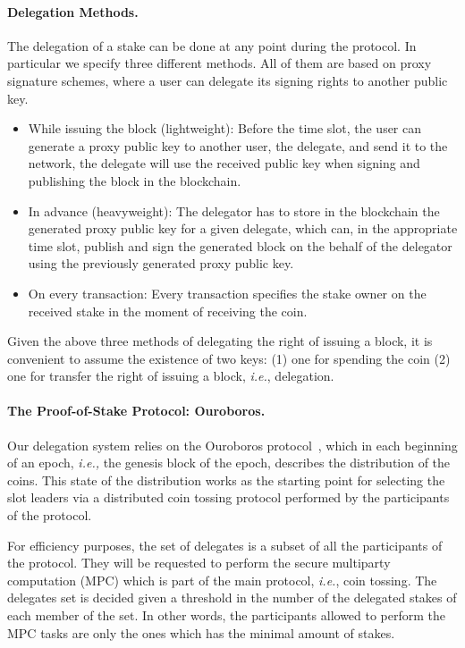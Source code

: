 \paragraph{Delegation Methods.} The delegation of a stake can be done at any point during the protocol. In particular we specify three different methods. All of them are based on proxy signature schemes, where a user can delegate its signing rights to another public key.
\begin{itemize}
    \item While issuing the block (lightweight): Before the time slot, the user can generate a proxy public key to another user, the delegate, and send it to the network, the delegate will use the received public key when signing and publishing the block in the blockchain.
    \item In advance (heavyweight): The delegator has to store in the blockchain the generated proxy public key for a given delegate, which can, in the appropriate time slot, publish and sign the generated block on the behalf of the delegator using the previously generated proxy public key.
    \item On every transaction: Every transaction specifies the stake owner on the received stake in the moment of receiving the coin. 
\end{itemize}
Given the above three methods of delegating the right of issuing a block, it is convenient to assume the existence of two keys: (1) one for spending the coin (2) one for transfer the right of issuing a block, \textit{i.e.}, delegation. 


\paragraph{The Proof-of-Stake Protocol: Ouroboros.} Our delegation system relies on the Ouroboros protocol~\cite{EPRINT:DGKR17}, which in each beginning of an epoch, \textit{i.e.,} the genesis block of the epoch, describes the distribution of the coins. This state of the distribution works as the starting point for selecting the slot leaders via a distributed coin tossing protocol performed by the participants of the protocol.  

For efficiency purposes, the set of delegates is a subset of all the participants of the protocol. They will be requested to perform the secure multiparty computation (MPC) which is part of the main protocol, \textit{i.e.}, coin tossing. The delegates set is decided given a threshold in the number of the delegated stakes of each member of the set. In other words, the  participants allowed to perform the MPC tasks are only the ones which has the minimal amount of stakes.  


